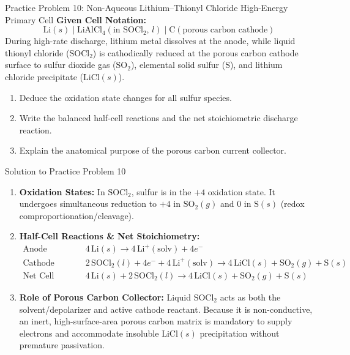 \documentclass[10pt,a4paper]{article}
\begin{document}
\begin{exercisebox}{Practice Problem 10: Non-Aqueous Lithium--Thionyl Chloride High-Energy Primary Cell}
\textbf{Given Cell Notation:}
\begin{equation*}
    \text{Li}(s) \mid \text{LiAlCl}_4(\text{in } \text{SOCl}_2,\, l) \mid \text{C}(\text{porous carbon cathode})
\end{equation*}
During high-rate discharge, lithium metal dissolves at the anode, while liquid thionyl chloride ($\text{SOCl}_2$) is cathodically reduced at the porous carbon cathode surface to sulfur dioxide gas ($\text{SO}_2$), elemental solid sulfur ($\text{S}$), and lithium chloride precipitate ($\text{LiCl}(s)$).
\begin{enumerate}[label=(\alph*)]
    \item Deduce the oxidation state changes for all sulfur species.
    \item Write the balanced half-cell reactions and the net stoichiometric discharge reaction.
    \item Explain the anatomical purpose of the porous carbon current collector.
\end{enumerate}
\end{exercisebox}

\begin{solutionbox}{Solution to Practice Problem 10}
\begin{enumerate}[label=(\alph*)]
    \item \textbf{Oxidation States:}
    In $\text{SOCl}_2$, sulfur is in the $+4$ oxidation state. It undergoes simultaneous reduction to $+4$ in $\text{SO}_2(g)$ and $0$ in $\text{S}(s)$ (redox comproportionation/cleavage).
    \item \textbf{Half-Cell Reactions \& Net Stoichiometry:}
    \begin{align*}
        \text{Anode (Oxidation):} \quad & 4\,\text{Li}(s) \longrightarrow 4\,\text{Li}^+(\text{solv}) + 4e^- \\
        \text{Cathode (Reduction):} \quad & 2\,\text{SOCl}_2(l) + 4e^- + 4\,\text{Li}^+(\text{solv}) \longrightarrow 4\,\text{LiCl}(s) + \text{SO}_2(g) + \text{S}(s) \\
        \text{Net Cell Reaction:} \quad & 4\,\text{Li}(s) + 2\,\text{SOCl}_2(l) \longrightarrow 4\,\text{LiCl}(s) + \text{SO}_2(g) + \text{S}(s)
    \end{align*}
    \item \textbf{Role of Porous Carbon Collector:} Liquid $\text{SOCl}_2$ acts as both the solvent/depolarizer and active cathode reactant. Because it is non-conductive, an inert, high-surface-area porous carbon matrix is mandatory to supply electrons and accommodate insoluble $\text{LiCl}(s)$ precipitation without premature passivation.
\end{enumerate}
\end{solutionbox}
\end{document}

